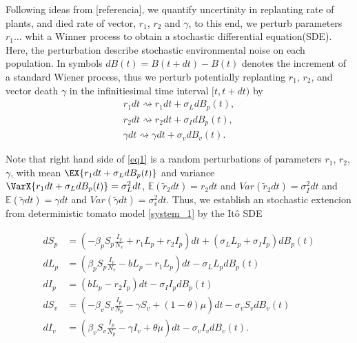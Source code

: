%
Following ideas from [referencia], we quantify uncertinity in replanting rate of
plants, and  died rate of vector, $r_1$, $r_2$ and $\gamma$, to this end, we
perturb parameters   $r_1 \dots$ whit a Winner
process to obtain a stochastic differential equation(SDE). Here, the 
perturbation describe stochastic environmental noise on each population. In
symbols $ dB(t)=B(t+dt)-B(t)$ denotes the increment of a standard Wiener
process, thus we perturb potentially replanting $r_1$, $r_2$, and vector death
$\gamma$ in the infinitiesimal time interval $[t, t + dt)$ by
\begin{equation}
	\label{eq1}
	\begin{aligned}
		{r}_1 dt \rightsquigarrow r_1 dt + \sigma_L dB_p(t),
		\\
		{r}_2 dt \rightsquigarrow r_2 dt + \sigma_Id B_p(t),
		\\
		\gamma dt \rightsquigarrow \gamma dt + \sigma_vd B_v(t).
	\end{aligned}
\end{equation}

	Note that right hand side of \eqref{eq1} is a random perturbations of parameters
$r_1$, $r_2$, $\gamma$, with mean
$
	\EX{r_1 dt + \sigma_L dB_p(t)}
$
and variance 
$
	\VarX{r_1 dt + \sigma_L dB_p(t)} = \sigma_L^2dt
$, 
$
	\mathbb{E}(\tilde{r}_2dt) = r_2dt
$ 
and
$
	Var(\tilde{r}_2dt) = \sigma_I^2dt
$ 
and 
$
	\mathbb{E}(\tilde{\gamma}dt) = \gamma dt
$ and 
$
	Var(\tilde{\gamma}dt) = \sigma_v^2dt
$.
%
Thus, we establish an stochastic extencion from deterministic tomato model 
\eqref{system_1} by the It\^{o} SDE

\begin{equation}
	\label{system_3}
	\begin{aligned}
		d S_p &=
			\left(
				-\beta_p S_p \frac{I_v}{N_v} + r_1 L_p + r_2 I_p
			\right)dt 
			+ (\sigma_L L_p
			+ 
			\sigma_I I_p)dB_p(t) 
		\\
		dL_p &=
			\left(
				\beta_p S_p \frac{I_v}{N_v} - b L_p - r_1 L_p
			\right) dt 
			- \sigma_L L_p dB_p(t) 
		\\
		d I_p &=
			\left(
				b L_p - r_2 I_p
			\right) dt 
			- \sigma_I I_p dB_p(t) 
		\\
		dS_v &=
			\left(
				-\beta_v S_v \frac{I_p}{N_p} - \gamma S_v  + (1-\theta) \mu
			\right)dt - \sigma_v S_v dB_v(t) 
		\\
		d I_v &=
			\left(
				\beta_v S_v \frac{I_p}{N_p} -\gamma I_v + \theta \mu
			\right) dt 
			- \sigma_v I_v dB_v(t).
	\end{aligned}
\end{equation}

